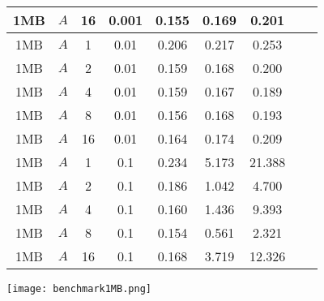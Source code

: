 \begin{figure}[H]
\begin{tabular}{|c|c|c|c|c|c|c|c|c|}
        1MB & $A$ & 16 & 0.001 & 0.155 & 0.169 & 0.201\\\hline
        1MB & $A$ & 1 & 0.01 & 0.206 & 0.217 & 0.253\\\hline
        1MB & $A$ & 2 & 0.01 & 0.159 & 0.168 & 0.200\\\hline
        1MB & $A$ & 4 & 0.01 & 0.159 & 0.167 & 0.189\\\hline
        1MB & $A$ & 8 & 0.01 & 0.156 & 0.168 & 0.193\\\hline
        1MB & $A$ & 16 & 0.01 & 0.164 & 0.174 & 0.209\\\hline
        1MB & $A$ & 1 & 0.1 & 0.234 & 5.173 & 21.388\\\hline
        1MB & $A$ & 2 & 0.1 & 0.186 & 1.042 & 4.700\\\hline
        1MB & $A$ & 4 & 0.1 & 0.160 & 1.436 & 9.393\\\hline
        1MB & $A$ & 8 & 0.1 & 0.154 & 0.561 & 2.321\\\hline
        1MB & $A$ & 16 & 0.1 & 0.168 & 3.719 & 12.326\\\hline
    \end{tabular}
    \vspace{1cm}
    \texttt{[image: benchmark1MB.png]}
\end{figure}

